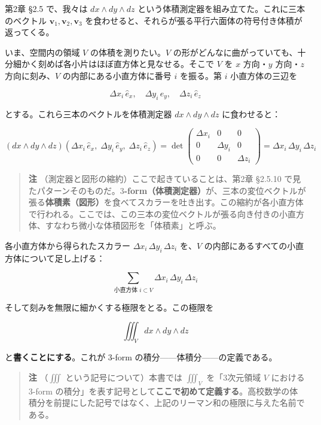 \documentclass[a4paper,12pt,openany]{book}
\begin{document}
第2章 §2.5 で、我々は \(dx \wedge dy \wedge dz\)
という体積測定器を組み立てた。これに三本のベクトル
\(\mathbf{v}_1, \mathbf{v}_2, \mathbf{v}_3\)
を食わせると、それらが張る平行六面体の符号付き体積が返ってくる。

いま、空間内の領域 \(V\) の体積を測りたい。\(V\)
の形がどんなに曲がっていても、十分細かく刻めば各小片はほぼ直方体と見なせる。そこで
\(V\) を \(x\) 方向・\(y\) 方向・\(z\) 方向に刻み、\(V\)
の内部にある小直方体に番号 \(i\) を振る。第 \(i\) 小直方体の三辺を

\[\Delta x_i\,\hat{e}_x,\quad \Delta y_i\,\hat{e}_y,\quad \Delta z_i\,\hat{e}_z\]

とする。これら三本のベクトルを体積測定器 \(dx \wedge dy \wedge dz\)
に食わせると：

\[(dx \wedge dy \wedge dz)(\Delta x_i\,\hat{e}_x,\; \Delta y_i\,\hat{e}_y,\; \Delta z_i\,\hat{e}_z) = \det\begin{pmatrix}\Delta x_i & 0 & 0 \\ 0 & \Delta y_i & 0 \\ 0 & 0 & \Delta z_i\end{pmatrix} = \Delta x_i\,\Delta y_i\,\Delta z_i\]

\begin{quote}
\textbf{注} （測定器と図形の縮約）ここで起きていることは、第2章 §2.5.10
で見たパターンそのものだ。\textbf{$3$-form（体積測定器）}が、三本の変位ベクトルが張る\textbf{体積素（図形）}を食べてスカラーを吐き出す。この縮約が各小直方体で行われる。ここでは、この三本の変位ベクトルが張る向き付きの小直方体、すなわち微小な体積図形を「体積素」と呼ぶ。
\end{quote}

各小直方体から得られたスカラー \(\Delta x_i\,\Delta y_i\,\Delta z_i\)
を、\(V\) の内部にあるすべての小直方体について足し上げる：

\[\sum_{\text{小直方体 }i \subset V} \Delta x_i\,\Delta y_i\,\Delta z_i\]

そして刻みを無限に細かくする極限をとる。この極限を

\[\iiint_V dx \wedge dy \wedge dz\]

と\textbf{書くことにする}。これが \(3\)-form
の積分——体積分——の定義である。

\begin{quote}
\textbf{注} （\(\iiint\) という記号について）本書では \(\iiint_V\)
を「3次元領域 \(V\) における \(3\)-form
の積分」を表す記号として\textbf{ここで初めて定義する}。高校数学の体積分を前提にした記号ではなく、上記のリーマン和の極限に与えた名前である。
\end{quote}
\end{document}
